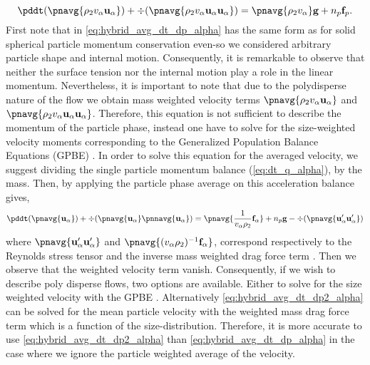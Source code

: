 \begin{equation}
    \pddt (\pnavg{\rho_2 v_\alpha\textbf{u}_\alpha})
    + \div(\pnavg{\rho_2 v_\alpha \textbf{u}_\alpha \textbf{u}_\alpha })
    = \pnavg{\rho_2 v_\alpha}\textbf{g}
    + n_p\textbf{f}_p.
    \label{eq:hybrid_avg_dt_dp_alpha}\\
\end{equation}
First note that in \ref{eq:hybrid_avg_dt_dp_alpha} has the same form as for solid spherical particle momentum conservation \citep{jackson1997locally} even-so we considered arbitrary particle shape and internal motion. 
Consequently, it is remarkable to observe that neither the surface tension nor the internal motion play a role in the linear momentum. 
Nevertheless, it is important to note that due to the polydisperse nature of the flow we obtain mass weighted velocity terms $\pnavg{\rho_2 v_\alpha\textbf{u}_\alpha}$ and $\pnavg{\rho_2 v_\alpha\textbf{u}_\alpha\textbf{u}_\alpha}$. 
Therefore, this equation is not sufficient to describe the momentum of the particle phase, instead one have to solve for the size-weighted velocity moments corresponding to the Generalized Population Balance Equations (GPBE)  \citep{fox2023generalized}. 
In order to solve this equation for the averaged velocity, we suggest dividing the single particle momentum balance (\ref{eq:dt_q_alpha}), by the mass. 
Then, by applying the particle phase average on this acceleration balance gives, 
\begin{equation}
    \pddt (\pnavg{\textbf{u}_\alpha})
    + \div(\pnavg{\textbf{u}_\alpha}\pnnavg{ \textbf{u}_\alpha })
    = 
    \pnavg{\frac{1}{v_\alpha\rho_2}\textbf{f}_\alpha}
    + n_p \textbf{g}
    - \div(\pnavg{\textbf{u}'_\alpha \textbf{u}'_\alpha })
    \label{eq:hybrid_avg_dt_dp2_alpha}
\end{equation}
where $\pnavg{\textbf{u}'_\alpha \textbf{u}'_\alpha }$ and $\pnavg{(v_\alpha\rho_2)^{-1} \textbf{f}_\alpha }$, correspond respectively to the Reynolds stress tensor and the inverse mass weighted drag force term \citep{jackson1997locally}. 
Then we observe that the weighted velocity term vanish. 
Consequently, if we wish to describe poly disperse flows, two options are available. 
Either to solve for the size weighted velocity with the GPBE \citet{fox2023generalized,marchisio2013computational}.
Alternatively \ref{eq:hybrid_avg_dt_dp2_alpha} can be solved for the mean particle velocity with the weighted mass drag force term which is a function of the size-distribution.  
Therefore, it is more accurate to use \ref{eq:hybrid_avg_dt_dp2_alpha} than \ref{eq:hybrid_avg_dt_dp_alpha} in the case where we ignore the particle weighted average of the velocity. 
 



